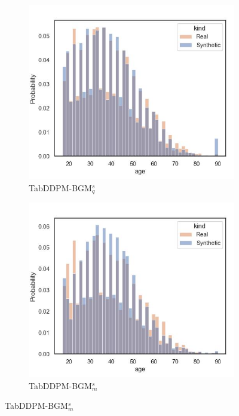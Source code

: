 \begin{figure}[h]
	\begin{subfigure}{0.32\textwidth}
		\centering
		\includegraphics[width=\textwidth]{images/dist_age/tab-ddpm-bgm-simTune.jpg}
		\caption{TabDDPM-BGM$^{s}_q$}
	\end{subfigure}
	\begin{subfigure}{0.32\textwidth}
		\centering
		\includegraphics[width=\textwidth]{images/dist_age/tab-ddpm-bgm-simTune-minmax.jpg}
		\caption{TabDDPM-BGM$^{s}_m$}
	\end{subfigure}

\end{figure}
